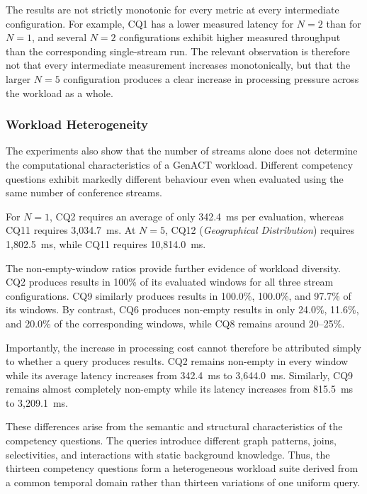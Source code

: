 The results are not strictly monotonic for every metric at every intermediate
configuration. For example, CQ1 has a lower measured latency for $N=2$ than
for $N=1$, and several $N=2$ configurations exhibit higher measured throughput
than the corresponding single-stream run. The relevant observation is therefore
not that every intermediate measurement increases monotonically, but that the
larger $N=5$ configuration produces a clear increase in processing pressure
across the workload as a whole.


\subsubsection{Workload Heterogeneity}
\label{subsubsec:genact-workload-heterogeneity}

The experiments also show that the number of streams alone does not determine
the computational characteristics of a GenACT workload. Different competency
questions exhibit markedly different behaviour even when evaluated using the
same number of conference streams.

For $N=1$, CQ2 requires an average of only 342.4~ms per evaluation, whereas
CQ11 requires 3,034.7~ms. At $N=5$, CQ12
(\emph{Geographical Distribution}) requires 1,802.5~ms, while CQ11 requires
10,814.0~ms.

The non-empty-window ratios provide further evidence of workload diversity.
CQ2 produces results in 100\% of its evaluated windows for all three stream
configurations. CQ9 similarly produces results in 100.0\%, 100.0\%, and
97.7\% of its windows. By contrast, CQ6 produces non-empty results in only
24.0\%, 11.6\%, and 20.0\% of the corresponding windows, while CQ8 remains
around 20--25\%.

Importantly, the increase in processing cost cannot therefore be attributed
simply to whether a query produces results. CQ2 remains non-empty in every
window while its average latency increases from 342.4~ms to 3,644.0~ms.
Similarly, CQ9 remains almost completely non-empty while its latency increases
from 815.5~ms to 3,209.1~ms.

These differences arise from the semantic and structural characteristics of the
competency questions. The queries introduce different graph patterns, joins,
selectivities, and interactions with static background knowledge. Thus, the
thirteen competency questions form a heterogeneous workload suite derived from
a common temporal domain rather than thirteen variations of one uniform query.



